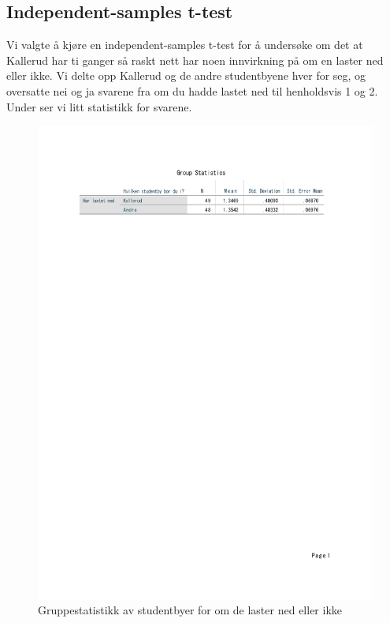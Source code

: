\subsection{Independent-samples t-test}
Vi valgte å kjøre en independent-samples t-test for å undersøke om det at Kallerud har ti ganger så raskt nett har noen innvirkning på om en laster ned eller ikke. Vi delte opp Kallerud og de andre studentbyene hver for seg, og oversatte nei og ja svarene fra om du hadde lastet ned til henholdsvis 1 og 2. Under ser vi litt statistikk for svarene. 
\begin{figure}[H]
    \centering
    \includegraphics[scale=0.7]{case_1/bilder/studentby_lasterned_ttest_stats.pdf}
    \caption{Gruppestatistikk av studentbyer for om de laster ned eller ikke}
    \label{fig:studby_lasterned_ttest_stats}
\end{figure}

